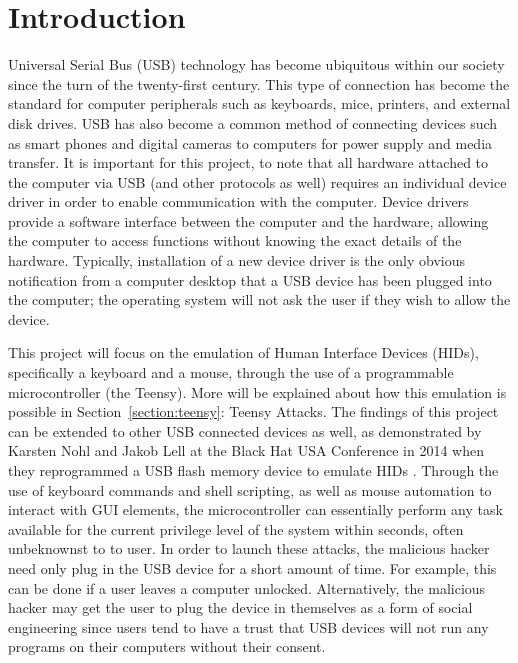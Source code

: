 \documentclass[pagenumbers]{ieee}
\begin{document}

\section{Introduction}
\label{section:intro}

Universal Serial Bus (USB) technology has become ubiquitous within our society since the turn of the twenty-first century. This type of connection has become the standard for computer peripherals such as keyboards, mice, printers, and external disk drives. USB has also become a common method of connecting devices such as smart phones and digital cameras to computers for power supply and media transfer. It is important for this project, to note that all hardware attached to the computer via USB (and other protocols as well) requires an individual device driver in order to enable communication with the computer. Device drivers provide a software interface between the computer and the hardware, allowing the computer to access functions without knowing the exact details of the hardware. Typically, installation of a new device driver is the only obvious notification from a computer desktop that a USB device has been plugged into the computer; the operating system will not ask the user if they wish to allow the device.

This project will focus on the emulation of Human Interface Devices (HIDs), specifically a keyboard and a mouse, through the use of a programmable microcontroller (the Teensy). More will be explained about how this emulation is possible in Section~\ref{section:teensy}: Teensy Attacks. The findings of this project can be extended to other USB connected devices as well, as demonstrated by Karsten Nohl and Jakob Lell at the Black Hat USA Conference in 2014 when they reprogrammed a USB flash memory device to emulate HIDs \cite{nohl}. Through the use of keyboard commands and shell scripting, as well as mouse automation to interact with GUI elements, the microcontroller can essentially perform any task available for the current privilege level of the system within seconds, often unbeknownst to to user. In order to launch these attacks, the malicious hacker need only plug in the USB device for a short amount of time. For example, this can be done if a user leaves a computer unlocked. Alternatively, the malicious hacker may get the user to plug the device in themselves as a form of social engineering since users tend to have a trust that USB devices will not run any programs on their computers without their consent.
\end{document}
